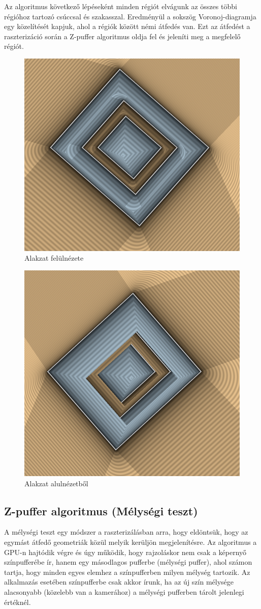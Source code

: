 Az algoritmus következő lépéseként minden régiót elvágunk az összes többi régióhoz tartozó csúccsal és szakasszal. Eredményül a sokszög Voronoj-diagramja egy közelítését kapjuk, ahol a régiók között némi átfedés van. Ezt az átfedést a raszterizáció során a Z-puffer algoritmus oldja fel és jeleníti meg a megfelelő régiót.

\begin{figure}[H]
    \centering
    \includegraphics[width=.6\linewidth]{images/algorithm_output_top_down.png}
    \caption{Alakzat felülnézete}
    \label{fig:algorithm_output_top_down-1}
\end{figure}
\begin{figure}[H]
    \centering
    \includegraphics[width=.6\linewidth]{images/algorithm_output_bottom_up.png}
    \caption{Alakzat alulnézetből}
    \label{fig:algorithm_output_bottom_up-1}
\end{figure}

\subsection{Z-puffer algoritmus (Mélységi teszt)}
A mélységi teszt egy módszer a raszterizálásban arra, hogy eldöntsük, hogy az egymást átfedő geometriák közül melyik kerüljön megjelenítésre. Az algoritmus a GPU-n hajtódik végre és úgy működik, hogy rajzoláskor nem csak a képernyő színpufferébe ír, hanem egy másodlagos pufferbe (mélységi puffer), ahol számon tartja, hogy minden egyes elemhez a színpufferben milyen mélység tartozik. Az alkalmazás esetében színpufferbe csak akkor írunk, ha az új szín mélysége alacsonyabb (közelebb van a kamerához) a mélységi pufferben tárolt jelenlegi értéknél.

